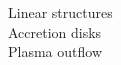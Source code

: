 \documentclass[preview]{standalone}
\begin{document}
Linear structures\\Accretion disks\\Plasma outflow\\
\end{document}
